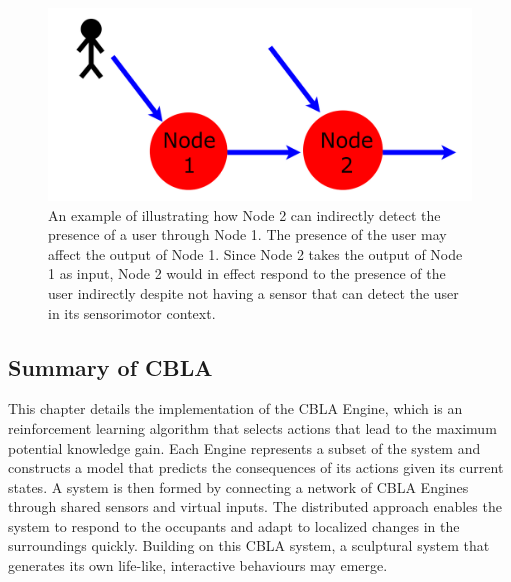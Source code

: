 \begin{figure}[!htb]
	\centering
	\includegraphics[height=0.20 \textheight]{"fig/cbla/Indirect input diagram"}
	\caption[Illustration explaining how virtual inputs may be used to detect changes outside of a node's sensorimotor context]{An example of illustrating how Node 2 can indirectly detect the presence of a user through Node 1. The presence of the user may affect the output of Node 1. Since Node 2 takes the output of Node 1 as input, Node 2 would in effect respond to the presence of the user indirectly despite not having a sensor that can detect the user in its sensorimotor context.}
	\label{fig:Indirect input diagram}
\end{figure}

\subsection{Summary of CBLA}

This chapter details the implementation of the CBLA Engine, which is an reinforcement learning algorithm that selects actions that lead to the maximum potential knowledge gain. Each Engine represents a subset of the system and constructs a model that predicts the consequences of its actions given its current states. A system is then formed by connecting a network of CBLA Engines through shared sensors and virtual inputs. The distributed approach enables the system to respond to the occupants and adapt to localized changes in the surroundings quickly. Building on this CBLA system, a sculptural system that generates its own life-like, interactive behaviours may emerge.

\FloatBarrier  

